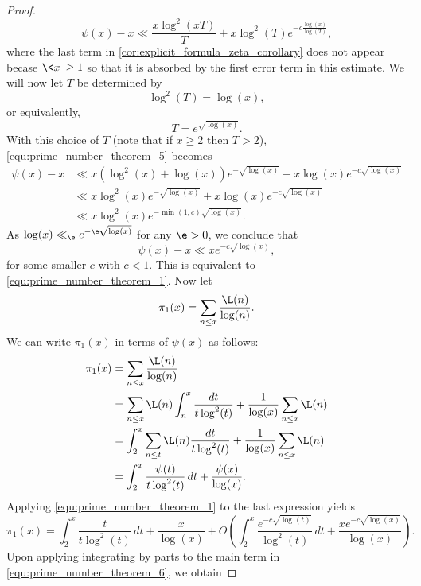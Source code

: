 \begin{proof}
\begin{equation}
          \psi(x)-x \ll \frac{x\log^{2}(xT)}{T}+x\log^{2}(T)e^{-c\frac{\log(x)}{\log(T)}},
        \end{equation}
        where the last term in \cref{cor:explicit_formula_zeta_corollary} does not appear becase $\<x\> \ge 1$ so that it is absorbed by the first error term in this estimate. We will now let $T$ be determined by
        \[
          \log^{2}(T) = \log(x),
        \]
        or equivalently,
        \[
          T = e^{\sqrt{\log(x)}}.
        \]
        With this choice of $T$ (note that if $x \ge 2$ then $T > 2$), \cref{equ:prime_number_theorem_5} becomes
        \begin{align*}
          \psi(x)-x &\ll x\left(\log^{2}(x)+\log(x)\right)e^{-\sqrt{\log(x)}}+x\log(x)e^{-c\sqrt{\log(x)}} \\
          &\ll x\log^{2}(x)e^{-\sqrt{\log(x)}}+x\log(x)e^{-c\sqrt{\log(x)}} \\
          &\ll x\log^{2}(x)e^{-\min(1,c)\sqrt{\log(x)}}.
        \end{align*}
        As $\log(x) \ll_{\e} e^{-\e\sqrt{\log(x)}}$ for any $\e > 0$, we conclude that
        \[
          \psi(x)-x \ll xe^{-c\sqrt{\log(x)}},
        \]
        for some smaller $c$ with $c < 1$. This is equivalent to \cref{equ:prime_number_theorem_1}. Now let
        \[
          \pi_{1}(x) = \sum_{n \le x}\frac{\L(n)}{\log(n)}.
        \]
        We can write $\pi_{1}(x)$ in terms of $\psi(x)$ as follows:
        \begin{align*}
          \pi_{1}(x) &= \sum_{n \le x}\frac{\L(n)}{\log(n)} \\
          &= \sum_{n \le x}\L(n)\int_{n}^{x}\frac{dt}{t\log^{2}(t)}+\frac{1}{\log(x)}\sum_{n \le x}\L(n) \\
          &= \int_{2}^{x}\sum_{n \le t}\L(n)\frac{dt}{t\log^{2}(t)}+\frac{1}{\log(x)}\sum_{n \le x}\L(n) \\
          &= \int_{2}^{x}\frac{\psi(t)}{t\log^{2}(t)}\,dt+\frac{\psi(x)}{\log(x)}.
        \end{align*}
        Applying \cref{equ:prime_number_theorem_1} to the last expression yields
        \begin{equation}\label{equ:prime_number_theorem_6}
          \pi_{1}(x) = \int_{2}^{x}\frac{t}{t\log^{2}(t)}\,dt+\frac{x}{\log(x)}+O\left(\int_{2}^{x}\frac{e^{-c\sqrt{\log(t)}}}{\log^{2}(t)}\,dt+\frac{xe^{-c\sqrt{\log(x)}}}{\log(x)}\right).
        \end{equation}
        Upon applying integrating by parts to the main term in \cref{equ:prime_number_theorem_6}, we obtain

\end{proof}
